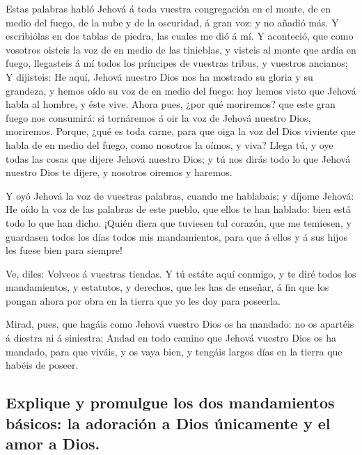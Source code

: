  Estas palabras habló Jehová á toda vuestra congregación en
el monte, de en medio del fuego, de la nube y de la oscuridad, á gran
voz: y no añadió más. Y escribiólas en dos tablas de piedra, las cuales
me dió á mí.  Y aconteció, que como vosotros oisteis la voz
de en medio de las tinieblas, y visteis al monte que ardía en fuego,
llegasteis á mí todos los príncipes de vuestras tribus, y vuestros
ancianos;  Y dijisteis: He aquí, Jehová nuestro Dios nos ha
mostrado su gloria y su grandeza, y hemos oído su voz de en medio del
fuego: hoy hemos visto que Jehová habla al hombre, y éste vive.
 Ahora pues, ¿por qué moriremos? que este gran fuego nos
consumirá: si tornáremos á oir la voz de Jehová nuestro Dios, moriremos.
 Porque, ¿qué es toda carne, para que oiga la voz del Dios
viviente que habla de en medio del fuego, como nosotros la oímos, y
viva?  Llega tú, y oye todas las cosas que dijere Jehová
nuestro Dios; y tú nos dirás todo lo que Jehová nuestro Dios te dijere,
y nosotros oiremos y haremos.

 Y oyó Jehová la voz de vuestras palabras, cuando me
hablabais; y díjome Jehová: He oído la voz de las palabras de este
pueblo, que ellos te han hablado: bien está todo lo que han dicho.
 ¡Quién diera que tuviesen tal corazón, que me temiesen, y
guardasen todos los días todos mis mandamientos, para que á ellos y á
sus hijos les fuese bien para siempre!

 Ve, diles: Volveos á vuestras tiendas.  Y tú
estáte aquí conmigo, y te diré todos los mandamientos, y estatutos, y
derechos, que les has de enseñar, á fin que los pongan ahora por obra en
la tierra que yo les doy para poseerla.

 Mirad, pues, que hagáis como Jehová vuestro Dios os ha
mandado: no os apartéis á diestra ni á siniestra;  Andad en
todo camino que Jehová vuestro Dios os ha mandado, para que viváis, y os
vaya bien, y tengáis largos días en la tierra que habéis de poseer.

\hypertarget{explique-y-promulgue-los-dos-mandamientos-buxe1sicos-la-adoraciuxf3n-a-dios-uxfanicamente-y-el-amor-a-dios.}{%
\subsection{Explique y promulgue los dos mandamientos básicos: la
adoración a Dios únicamente y el amor a
Dios.}\label{explique-y-promulgue-los-dos-mandamientos-buxe1sicos-la-adoraciuxf3n-a-dios-uxfanicamente-y-el-amor-a-dios.}}

